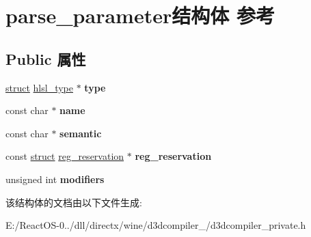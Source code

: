 \hypertarget{structparse__parameter}{}\section{parse\+\_\+parameter结构体 参考}
\label{structparse__parameter}
\subsection*{Public 属性}
\begin{DoxyCompactItemize}
\item 
\mbox{\label{structparse__parameter_a2bf54a12c5c6efefdd45ff2d1dcb4022}} 
\hyperlink{interfacestruct}{struct} \hyperlink{structhlsl__type}{hlsl\+\_\+type} $\ast$ {\bfseries type}
\item 
\mbox{\label{structparse__parameter_ad691f5dd9529dc3b495979ab0a14e33a}} 
const char $\ast$ {\bfseries name}
\item 
\mbox{\label{structparse__parameter_a9decb2f611ff4ddfa94b5b4d9219d766}} 
const char $\ast$ {\bfseries semantic}
\item 
\mbox{\label{structparse__parameter_a50a5149914a343c6fd07688e59f91280}} 
const \hyperlink{interfacestruct}{struct} \hyperlink{structreg__reservation}{reg\+\_\+reservation} $\ast$ {\bfseries reg\+\_\+reservation}
\item 
\mbox{\label{structparse__parameter_a46a3db75f1186aadd0a8d1715478fb51}} 
unsigned int {\bfseries modifiers}
\end{DoxyCompactItemize}


该结构体的文档由以下文件生成\+:\begin{DoxyCompactItemize}
\item 
E\+:/\+React\+O\+S-\/0../dll/directx/wine/d3dcompiler\+\_/d3dcompiler\+\_\+private.\+h\end{DoxyCompactItemize}
